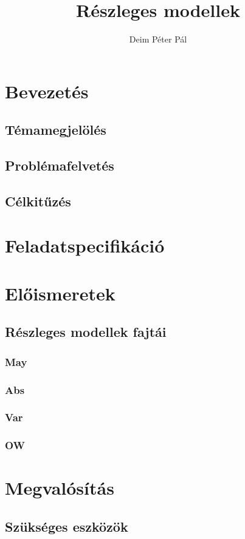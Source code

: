 \documentclass[12pt]{article}
\title{Részleges modellek}
\author{Deim Péter Pál}
\begin{document}
	
	\tableofcontents
	
	\newpage
	\section{Bevezetés}	
	\subsection{Témamegjelölés}
	\subsection{Problémafelvetés}
	\subsection{Célkitűzés}
	\section{Feladatspecifikáció}
	\section{Előismeretek}
	\subsection{Részleges modellek fajtái}
	\subsubsection{May}
	\subsubsection{Abs}
	\subsubsection{Var}
	\subsubsection{OW}
	\section{Megvalósítás}
	\subsection{Szükséges eszközök}
\end{document}

